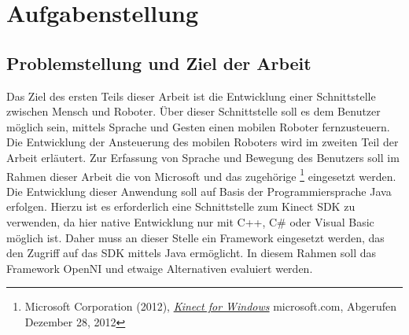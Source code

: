\chapter{Aufgabenstellung}
\label{chap:Aufgabenstellung}

\section{Problemstellung und Ziel der Arbeit}


%

%
Das Ziel des ersten Teils dieser Arbeit ist die Entwicklung einer Schnittstelle zwischen Mensch und Roboter.
\"Uber dieser Schnittstelle soll es dem Benutzer m\"oglich sein, mittels Sprache und Gesten einen mobilen Roboter fernzusteuern. 
Die Entwicklung der Ansteuerung des mobilen Roboters wird im zweiten Teil der Arbeit erl\"autert.
\newline
Zur Erfassung von Sprache und Bewegung des Benutzers soll im Rahmen dieser Arbeit die \textit{} von Microsoft 
und das zugeh\"orige \textit{} \footnote{Microsoft Corporation (2012), \href{http://www.microsoft.com/en-us/kinectforwindows/}{\textit{Kinect for Windows}} microsoft.com, Abgerufen Dezember 28, 2012} eingesetzt werden. 
Die Entwicklung dieser Anwendung soll auf Basis der Programmiersprache Java erfolgen.
Hierzu ist es erforderlich eine Schnittstelle zum Kinect \acrshort{SDK} zu verwenden, da hier native Entwicklung nur mit C++, C\# oder Visual Basic m\"oglich ist.
Daher muss an dieser Stelle ein Framework eingesetzt werden, das den Zugriff auf das \acrshort{SDK} mittels Java erm\"oglicht.
In diesem Rahmen soll das Framework OpenNI und etwaige Alternativen evaluiert werden.


